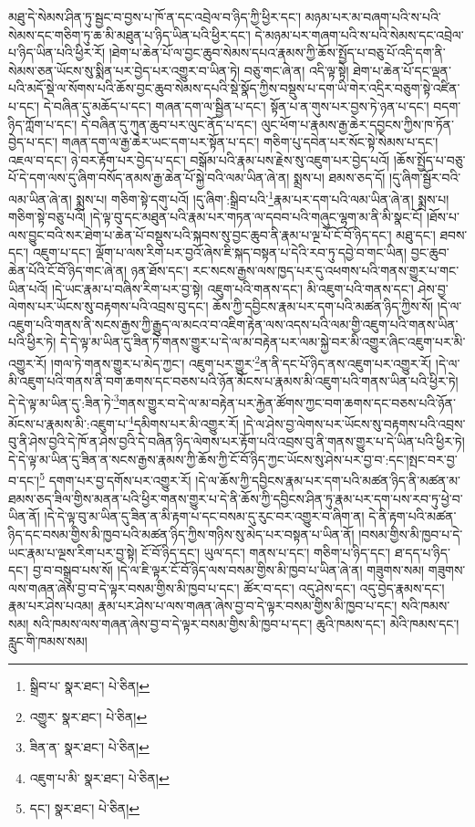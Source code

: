 མཐུ་དེ་སེམས་ཤིན་ཏུ་སྦྱང་བ་བྱས་པ་ཁོ་ན་དང་འབྲེལ་བ་ཉིད་ཀྱི་ཕྱིར་དང་། མཉམ་པར་མ་བཞག་པའི་ས་པའི་སེམས་དང་གཅིག་ཏུ་ཆ་མི་མཐུན་པ་ཉིད་ཡིན་པའི་ཕྱིར་དང་། དེ་མཉམ་པར་གཞག་པའི་ས་པའི་སེམས་དང་འབྲེལ་པ་ཉིད་ཡིན་པའི་ཕྱིར་རོ། །ཐེག་པ་ཆེན་པོ་ལ་བྱང་ཆུབ་སེམས་དཔའ་རྣམས་ཀྱི་ཆོས་སྤྱོད་པ་བཅུ་པོ་འདི་དག་ནི་སེམས་ཅན་ཡོངས་སུ་སྨིན་པར་བྱེད་པར་འགྱུར་བ་ཡིན་ཏེ། བཅུ་གང་ཞེ་ན། འདི་ལྟ་སྟེ། ཐེག་པ་ཆེན་པོ་དང་ལྡན་པའི་མདོ་སྡེ་ལ་སོགས་པའི་ཆོས་བྱང་ཆུབ་སེམས་དཔའི་སྡེ་སྣོད་ཀྱིས་བསྡུས་པ་དག་ཡི་གེར་འདྲིར་བཅུག་སྟེ་འཛིན་པ་དང་། དེ་བཞིན་དུ་མཆོད་པ་དང་། གཞན་དག་ལ་སྦྱིན་པ་དང་། སྟོན་པ་ན་གུས་པར་བྱས་ཏེ་ཉན་པ་དང་། བདག་ཉིད་ཀློག་པ་དང་། དེ་བཞིན་དུ་ཀུན་ཆུབ་པར་ལུང་ནོད་པ་དང་། ལུང་ཕོག་པ་རྣམས་རྒྱ་ཆེར་དབྱངས་ཀྱིས་ཁ་ཏོན་བྱེད་པ་དང་། གཞན་དག་ལ་རྒྱ་ཆེར་ཡང་དག་པར་སྟོན་པ་དང་། གཅིག་པུ་དབེན་པར་སོང་སྟེ་སེམས་པ་དང་། འཇལ་བ་དང་། ཉེ་བར་རྟོག་པར་བྱེད་པ་དང་། བསྒོམ་པའི་རྣམ་པས་རྗེས་སུ་འཇུག་པར་བྱེད་པའོ། །ཆོས་སྤྱོད་པ་བཅུ་པོ་དེ་དག་ལས་དུ་ཞིག་བསོད་ནམས་རྒྱ་ཆེན་པོ་སྐྱེ་བའི་ལམ་ཡིན་ཞེ་ན། སྨྲས་པ། ཐམས་ཅད་དོ། །དུ་ཞིག་སྦྱོར་བའི་ལམ་ཡིན་ཞེ་ན། སྨྲས་པ། གཅིག་སྟེ་དགུ་པའོ། །དུ་ཞིག་:སྒྲིབ་པའི་\footnote{སྒྲིབ་པ་  སྣར་ཐང་།  པེ་ཅིན། }རྣམ་པར་དག་པའི་ལམ་ཡིན་ཞེ་ན། སྨྲས་པ། གཅིག་སྟེ་བཅུ་པའོ། །དེ་ལྟ་བུ་དང་མཐུན་པའི་རྣམ་པར་གཏན་ལ་དབབ་པའི་གཞུང་ལྷག་མ་ནི་མི་སྣང་ངོ། །ཐོས་པ་ལས་བྱུང་བའི་སར་ཐེག་པ་ཆེན་པོ་བསྡུས་པའི་སྐབས་སུ་བྱང་ཆུབ་ནི་རྣམ་པ་ལྔ་པོ་ངོ་བོ་ཉིད་དང་། མཐུ་དང་། ཐབས་དང་། འཇུག་པ་དང་། ལྡོག་པ་ལས་རིག་པར་བྱའོ་ཞེས་ཇི་སྐད་བསྟན་པ་དེའི་རབ་ཏུ་དབྱེ་བ་གང་ཡིན། བྱང་ཆུབ་ཆེན་པོའི་ངོ་བོ་ཉིད་གང་ཞེ་ན། ཉན་ཐོས་དང་། རང་སངས་རྒྱས་ལས་ཁྱད་པར་དུ་འཕགས་པའི་གནས་གྱུར་པ་གང་ཡིན་པའོ། །དེ་ཡང་རྣམ་པ་བཞིས་རིག་པར་བྱ་སྟེ། འཇུག་པའི་གནས་དང་། མི་འཇུག་པའི་གནས་དང་། ཤེས་བྱ་ལེགས་པར་ཡོངས་སུ་བརྟགས་པའི་འབྲས་བུ་དང་། ཆོས་ཀྱི་དབྱིངས་རྣམ་པར་དག་པའི་མཚན་ཉིད་ཀྱིས་སོ། །དེ་ལ་འཇུག་པའི་གནས་ནི་སངས་རྒྱས་ཀྱི་རྒྱུད་ལ་མངའ་བ་འཇིག་རྟེན་ལས་འདས་པའི་ལམ་གྱི་འཇུག་པའི་གནས་ཡིན་པའི་ཕྱིར་ཏེ། དེ་དེ་ལྟ་མ་ཡིན་དུ་ཟིན་ཏེ་གནས་གྱུར་པ་དེ་ལ་མ་བརྟེན་པར་ལམ་སྐྱེ་བར་མི་འགྱུར་ཞིང་འཇུག་པར་མི་འགྱུར་རོ། །གལ་ཏེ་གནས་གྱུར་པ་མེད་ཀྱང་། འཇུག་པར་གྱུར་\footnote{འགྱུར་  སྣར་ཐང་།  པེ་ཅིན། }ན་ནི་དང་པོ་ཉིད་ནས་འཇུག་པར་འགྱུར་རོ། །དེ་ལ་མི་འཇུག་པའི་གནས་ནི་བག་ཆགས་དང་བཅས་པའི་ཉོན་མོངས་པ་རྣམས་མི་འཇུག་པའི་གནས་ཡིན་པའི་ཕྱིར་ཏེ། དེ་དེ་ལྟ་མ་ཡིན་དུ་:ཟིན་ཏེ་\footnote{ཟིན་ན་  སྣར་ཐང་།  པེ་ཅིན། }གནས་གྱུར་བ་དེ་ལ་མ་བརྟེན་པར་རྐྱེན་ཚོགས་ཀྱང་བག་ཆགས་དང་བཅས་པའི་ཉོན་མོངས་པ་རྣམས་མི་:འཇུག་པ་\footnote{འཇུག་པ་མི་  སྣར་ཐང་།  པེ་ཅིན། }དམིགས་པར་མི་འགྱུར་རོ། །དེ་ལ་ཤེས་བྱ་ལེགས་པར་ཡོངས་སུ་བརྟགས་པའི་འབྲས་བུ་ནི་ཤེས་བྱའི་དེ་ཁོ་ན་ཤེས་བྱའི་དེ་བཞིན་ཉིད་ལེགས་པར་རྟོག་པའི་འབྲས་བུ་ནི་གནས་གྱུར་པ་དེ་ཡིན་པའི་ཕྱིར་ཏེ། དེ་དེ་ལྟ་མ་ཡིན་དུ་ཟིན་ན་སངས་རྒྱས་རྣམས་ཀྱི་ཆོས་ཀྱི་ངོ་བོ་ཉིད་ཀྱང་ཡོངས་སུ་ཤེས་པར་བྱ་བ་:དང་།སྤང་བར་བྱ་བ་དང་།\footnote{དང་།  སྣར་ཐང་།  པེ་ཅིན། } དགག་པར་བྱ་དགོས་པར་འགྱུར་རོ། །དེ་ལ་ཆོས་ཀྱི་དབྱིངས་རྣམ་པར་དག་པའི་མཚན་ཉིད་ནི་མཚན་མ་ཐམས་ཅད་ཟིལ་གྱིས་མནན་པའི་ཕྱིར་གནས་གྱུར་པ་དེ་ནི་ཆོས་ཀྱི་དབྱིངས་ཤིན་ཏུ་རྣམ་པར་དག་པས་རབ་ཏུ་ཕྱེ་བ་ཡིན་ནོ། །དེ་དེ་ལྟ་བུ་མ་ཡིན་དུ་ཟིན་ན་མི་རྟག་པ་དང་བསམ་དུ་རུང་བར་འགྱུར་བ་ཞིག་ན། དེ་ནི་རྟག་པའི་མཚན་ཉིད་དང་བསམ་གྱིས་མི་ཁྱབ་པའི་མཚན་ཉིད་ཀྱིས་གཉིས་སུ་མེད་པར་བསྟན་པ་ཡིན་ནོ། །བསམ་གྱིས་མི་ཁྱབ་པ་དེ་ཡང་རྣམ་པ་ལྔས་རིག་པར་བྱ་སྟེ། ངོ་བོ་ཉིད་དང་། ཡུལ་དང་། གནས་པ་དང་། གཅིག་པ་ཉིད་དང་། ཐ་དད་པ་ཉིད་དང་། བྱ་བ་བསྒྲུབ་པས་སོ། །དེ་ལ་ཇི་ལྟར་ངོ་བོ་ཉིད་ལས་བསམ་གྱིས་མི་ཁྱབ་པ་ཡིན་ཞེ་ན། གཟུགས་སམ། གཟུགས་ལས་གཞན་ཞེས་བྱ་བ་དེ་ལྟར་བསམ་གྱིས་མི་ཁྱབ་པ་དང་། ཚོར་བ་དང་། འདུ་ཤེས་དང་། འདུ་བྱེད་རྣམས་དང་། རྣམ་པར་ཤེས་པའམ། རྣམ་པར་ཤེས་པ་ལས་གཞན་ཞེས་བྱ་བ་དེ་ལྟར་བསམ་གྱིས་མི་ཁྱབ་པ་དང་། སའི་ཁམས་སམ། སའི་ཁམས་ལས་གཞན་ཞེས་བྱ་བ་དེ་ལྟར་བསམ་གྱིས་མི་ཁྱབ་པ་དང་། ཆུའི་ཁམས་དང་། མེའི་ཁམས་དང་། རླུང་གི་ཁམས་སམ། 